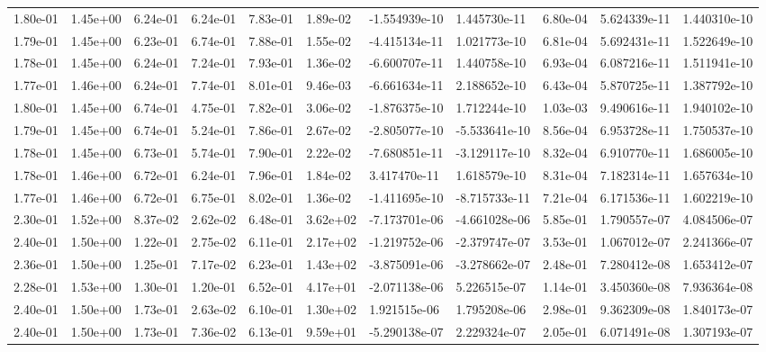 \begin{longtable}{| p{} | p{} |}
1.80e-01 & 1.45e+00 & 6.24e-01 & 6.24e-01 & 7.83e-01 & 1.89e-02 & -1.554939e-10 &  1.445730e-11 &  6.80e-04 &  5.624339e-11 &  1.440310e-10 \\
1.79e-01 & 1.45e+00 & 6.23e-01 & 6.74e-01 & 7.88e-01 & 1.55e-02 & -4.415134e-11 &  1.021773e-10 &  6.81e-04 &  5.692431e-11 &  1.522649e-10 \\
1.78e-01 & 1.45e+00 & 6.24e-01 & 7.24e-01 & 7.93e-01 & 1.36e-02 & -6.600707e-11 &  1.440758e-10 &  6.93e-04 &  6.087216e-11 &  1.511941e-10 \\
1.77e-01 & 1.46e+00 & 6.24e-01 & 7.74e-01 & 8.01e-01 & 9.46e-03 & -6.661634e-11 &  2.188652e-10 &  6.43e-04 &  5.870725e-11 &  1.387792e-10 \\
1.80e-01 & 1.45e+00 & 6.74e-01 & 4.75e-01 & 7.82e-01 & 3.06e-02 & -1.876375e-10 &  1.712244e-10 &  1.03e-03 &  9.490616e-11 &  1.940102e-10 \\
1.79e-01 & 1.45e+00 & 6.74e-01 & 5.24e-01 & 7.86e-01 & 2.67e-02 & -2.805077e-10 & -5.533641e-10 &  8.56e-04 &  6.953728e-11 &  1.750537e-10 \\
1.78e-01 & 1.45e+00 & 6.73e-01 & 5.74e-01 & 7.90e-01 & 2.22e-02 & -7.680851e-11 & -3.129117e-10 &  8.32e-04 &  6.910770e-11 &  1.686005e-10 \\
1.78e-01 & 1.46e+00 & 6.72e-01 & 6.24e-01 & 7.96e-01 & 1.84e-02 &  3.417470e-11 &  1.618579e-10 &  8.31e-04 &  7.182314e-11 &  1.657634e-10 \\
1.77e-01 & 1.46e+00 & 6.72e-01 & 6.75e-01 & 8.02e-01 & 1.36e-02 & -1.411695e-10 & -8.715733e-11 &  7.21e-04 &  6.171536e-11 &  1.602219e-10 \\
2.30e-01 & 1.52e+00 & 8.37e-02 & 2.62e-02 & 6.48e-01 & 3.62e+02 & -7.173701e-06 & -4.661028e-06 &  5.85e-01 &  1.790557e-07 &  4.084506e-07 \\
2.40e-01 & 1.50e+00 & 1.22e-01 & 2.75e-02 & 6.11e-01 & 2.17e+02 & -1.219752e-06 & -2.379747e-07 &  3.53e-01 &  1.067012e-07 &  2.241366e-07 \\
2.36e-01 & 1.50e+00 & 1.25e-01 & 7.17e-02 & 6.23e-01 & 1.43e+02 & -3.875091e-06 & -3.278662e-07 &  2.48e-01 &  7.280412e-08 &  1.653412e-07 \\
2.28e-01 & 1.53e+00 & 1.30e-01 & 1.20e-01 & 6.52e-01 & 4.17e+01 & -2.071138e-06 &  5.226515e-07 &  1.14e-01 &  3.450360e-08 &  7.936364e-08 \\
2.40e-01 & 1.50e+00 & 1.73e-01 & 2.63e-02 & 6.10e-01 & 1.30e+02 &  1.921515e-06 &  1.795208e-06 &  2.98e-01 &  9.362309e-08 &  1.840173e-07 \\
2.40e-01 & 1.50e+00 & 1.73e-01 & 7.36e-02 & 6.13e-01 & 9.59e+01 & -5.290138e-07 &  2.229324e-07 &  2.05e-01 &  6.071491e-08 &  1.307193e-07 \\

\end{longtable}
